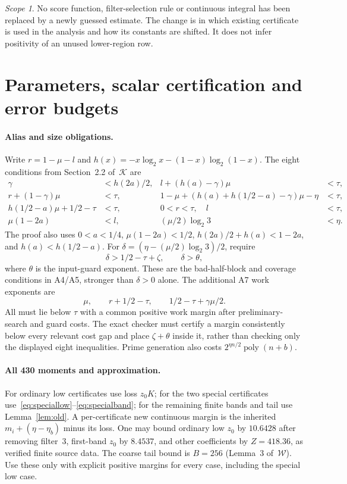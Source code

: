 \documentclass[11pt]{article}
\theoremstyle{remark}\newtheorem*{remark}{Scope}
\newcommand{\poly}{\operatorname{poly}}
\begin{document}
\begin{remark}
No score function, filter-selection rule or continuous integral has
been replaced by a newly guessed estimate. The change is in which
existing certificate is used in the analysis and how its constants
are shifted. It does not infer positivity of an unused lower-region row.
\end{remark}

\section{Parameters, scalar certification and error budgets}\label{sec:admissible}


\paragraph{Alias and size obligations.}
Write $r=1-\mu-l$ and $h(x)=-x\log_2x-(1-x)\log_2(1-x)$.
The eight conditions from Section~2.2 of~$\mathcal K$ are
\begin{align*}
 \gamma&<h(2a)/2, & l+(h(a)-\gamma)\mu&<\tau,\\
 r+(1-\gamma)\mu&<\tau,
 &1-\mu+(h(a)+h(1/2-a)-\gamma)\mu-\eta&<\tau,\\
 h(1/2-a)\mu+1/2-\tau&<\tau,
 &0<r<\tau,\quad l&<\tau,\\
 \mu(1-2a)&<l, &(\mu/2)\log_2 3&<\eta.
\end{align*}
The proof also uses $0<a<1/4$, $\mu(1-2a)<1/2$,
$h(2a)/2+h(a)<1-2a$, and $h(a)<h(1/2-a)$.
For $\delta=(\eta-(\mu/2)\log_2 3)/2$, require
\[
 \delta>1/2-\tau+\zeta,\qquad \delta>\theta,
\]
where $\theta$ is the input-guard exponent. These are the bad-half-block
and coverage conditions in A4/A5, stronger than $\delta>0$ alone.
The additional A7 work exponents are
\[
 \mu,\qquad r+1/2-\tau,\qquad1/2-\tau+\gamma\mu/2.
\]
All must lie below $\tau$ with a common positive work margin after
preliminary-search and guard costs. The exact checker must certify a
margin consistently below every relevant cost gap and place
$\zeta+\theta$ inside it, rather than checking only the displayed eight
inequalities. Prime generation also costs $2^{\eta n/2}\poly(n+b)$.

\paragraph{All 430 moments and approximation.}
For ordinary low certificates use loss $z_0K$; for the two special
certificates use~\eqref{eq:speciallow}--\eqref{eq:specialband}; for the
remaining finite bands and tail use Lemma~\ref{lem:old}. A per-certificate
new continuous margin is the inherited $m_i+(\eta-\eta_b)$ minus its loss.
One may bound ordinary low $z_0$ by $10.6428$ after removing filter~3,
first-band $z_0$ by $8.4537$, and other coefficients by $Z=418.36$,
as verified finite source data. The coarse tail bound is $B=256$
(Lemma~3 of~$\mathcal W$). Use these only with explicit positive
margins for every case, including the special low case.
\end{document}
